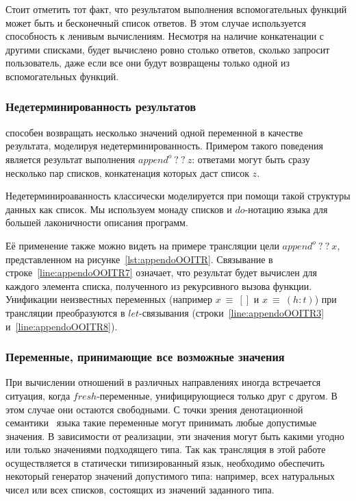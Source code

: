 Стоит отметить тот факт, что результатом выполнения вспомогательных функций может быть и бесконечный список ответов.
В этом случае используется способность \haskell{} к ленивым вычислениям.
Несмотря на наличие конкатенации с другими списками, будет вычислено ровно столько ответов, сколько запросит пользователь, даже если все они будут возвращены только одной из вспомогательных функций.


\subsubsection{Недетерминированность результатов}
\label{sec:nedeterm}

\miniKanren{} способен возвращать несколько значений одной переменной в качестве результата, моделируя недетерминированность.
Примером такого поведения является результат выполнения $append^o \ ? \ ? \ z$: ответами могут быть сразу несколько пар списков, конкатенация которых даст список $z$.

Недетерминироаванность классически моделируется при помощи такой структуры данных как список.
Мы используем монаду списков и $do$-нотацию языка \haskell{} для большей лаконичности описания программ.

Её применение также можно видеть на примере трансляции цели $append^o \ ? \ ? \ x$, представленном на рисунке~\ref{lst:appendoOOITR}.
Связывание в строке~\ref{line:appendoOOITR7} означает, что результат будет вычислен для каждого элемента списка, полученного из рекурсивного вызова функции.
Унификации неизвестных переменных (например $x~\equiv~[]$ и $x~\equiv~(h:t)$) при трансляции преобразуются в $let$-связывания (строки~\ref{line:appendoOOITR3} и~\ref{line:appendoOOITR8}).


\subsubsection{Переменные, принимающие все возможные значения}
\label{sec:transgen}

При вычислении отношений в различных направлениях иногда встречается ситуация, когда $fresh$-переменные, унифицирующиеся только друг с другом.
В этом случае они остаются свободными.
С точки зрения денотационной семантики~\cite{rozplokhas2019certified} языка \miniKanren{} такие переменные могут принимать любые допустимые значения.
В зависимости от реализации, эти значения могут быть какими угодно или только значениями подходящего типа.
Так как трансляция в этой работе осуществляется в статически типизированный язык, необходимо обеспечить некоторый генератор значений допустимого типа: например, всех натуральных чисел или всех списков, состоящих из значений заданного типа.

